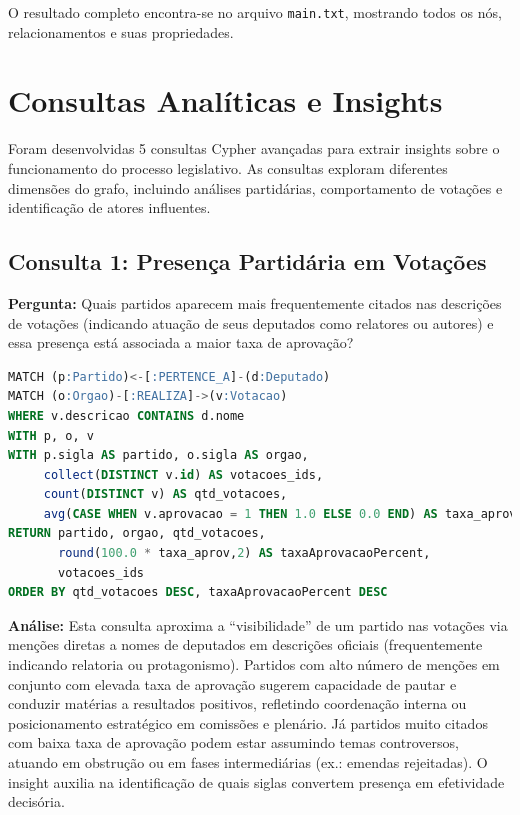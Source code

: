 \documentclass[12pt,a4paper]{article}
\begin{document}
O resultado completo encontra-se no arquivo \texttt{main.txt}, mostrando todos os nós, relacionamentos e suas propriedades.

\section{Consultas Analíticas e Insights}

Foram desenvolvidas 5 consultas Cypher avançadas para extrair insights sobre o funcionamento do processo legislativo. As consultas exploram diferentes dimensões do grafo, incluindo análises partidárias, comportamento de votações e identificação de atores influentes.

\subsection{Consulta 1: Presença Partidária em Votações}

\textbf{Pergunta:} Quais partidos aparecem mais frequentemente citados nas descrições de votações (indicando atuação de seus deputados como relatores ou autores) e essa presença está associada a maior taxa de aprovação?

\begin{lstlisting}[language=SQL,caption=Consulta Cypher 1]
MATCH (p:Partido)<-[:PERTENCE_A]-(d:Deputado)
MATCH (o:Orgao)-[:REALIZA]->(v:Votacao)
WHERE v.descricao CONTAINS d.nome
WITH p, o, v
WITH p.sigla AS partido, o.sigla AS orgao,
     collect(DISTINCT v.id) AS votacoes_ids,
     count(DISTINCT v) AS qtd_votacoes,
     avg(CASE WHEN v.aprovacao = 1 THEN 1.0 ELSE 0.0 END) AS taxa_aprov
RETURN partido, orgao, qtd_votacoes,
       round(100.0 * taxa_aprov,2) AS taxaAprovacaoPercent,
       votacoes_ids
ORDER BY qtd_votacoes DESC, taxaAprovacaoPercent DESC
\end{lstlisting}

\textbf{Análise:} Esta consulta aproxima a ``visibilidade'' de um partido nas votações via menções diretas a nomes de deputados em descrições oficiais (frequentemente indicando relatoria ou protagonismo). Partidos com alto número de menções em conjunto com elevada taxa de aprovação sugerem capacidade de pautar e conduzir matérias a resultados positivos, refletindo coordenação interna ou posicionamento estratégico em comissões e plenário. Já partidos muito citados com baixa taxa de aprovação podem estar assumindo temas controversos, atuando em obstrução ou em fases intermediárias (ex.: emendas rejeitadas). O insight auxilia na identificação de quais siglas convertem presença em efetividade decisória.
\end{document}
